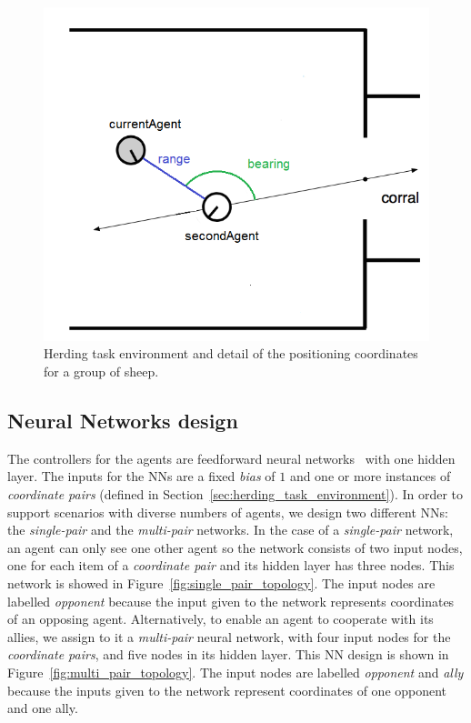 \documentclass[conference]{IEEEtran}
\begin{document}
\begin{figure}[ht]
	\centering
	\includegraphics[width=0.8\hsize]{imgs/herding_environment.png}
	\caption{Herding task environment and detail of the positioning coordinates for a group of sheep.}
	\label{fig:task_env}
\end{figure}


\subsection{Neural Networks design}
\label{sec:NN_design}
The controllers for the agents are feedforward neural networks~\cite{bebis1994feed} with one hidden layer.
The inputs for the NNs are a fixed \textit{bias} of $1$ and one or more instances of \textit{coordinate pairs} (defined in Section~\ref{sec:herding_task_environment}).
In order to support scenarios with diverse numbers of agents, we design two different NNs: the \textit{single-pair} and the \textit{multi-pair} networks. 
In the case of a \textit{single-pair} network, an agent can only see one other agent so the network consists of two input nodes, one for each item of a \textit{coordinate pair} and its hidden layer has three nodes. 
This network is showed in Figure~\ref{fig:single_pair_topology}.
The input nodes are labelled \textit{opponent} because the input given to the network represents coordinates of an opposing agent.
Alternatively, to enable an agent to cooperate with its allies, we assign to it a \textit{multi-pair} neural network, with four input nodes for the \textit{coordinate pairs}, and five nodes in its hidden layer.
This NN design is shown in Figure~\ref{fig:multi_pair_topology}.
The input nodes are labelled \textit{opponent} and \textit{ally} because the inputs given to the network represent coordinates of one opponent and one ally.
\end{document}
